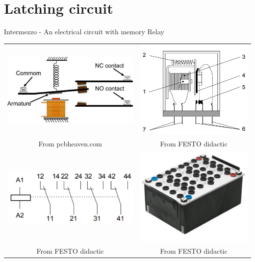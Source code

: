 \documentclass[presentation,aspectratio=1610]{beamer}
\begin{document}
\section{Latching circuit}
\label{sec:org0fdbbec}
\begin{frame}[label={sec:orgc4aa3c0}]{Intermezzo - An electrical circuit with memory}
\alert{Relay} 
\begin{center}
\begin{tabular}{cc}
\includegraphics[width=0.4\linewidth]{../../figures/howrelayswork.jpg} &
\includegraphics[width=0.3\linewidth]{../../figures/festo-relay-principle.png}\\
{\tiny From pcbheaven.com} & {\tiny From FESTO didactic}\\
\includegraphics[width=0.35\linewidth]{../../figures/festo-relay-switches.png} &
\includegraphics[width=0.25\linewidth]{../../figures/festo-relay-box.jpg}\\
{\tiny From FESTO didactic} & {\tiny From FESTO didactic}\\
\end{tabular}
\end{center}
\end{frame}
\end{document}
